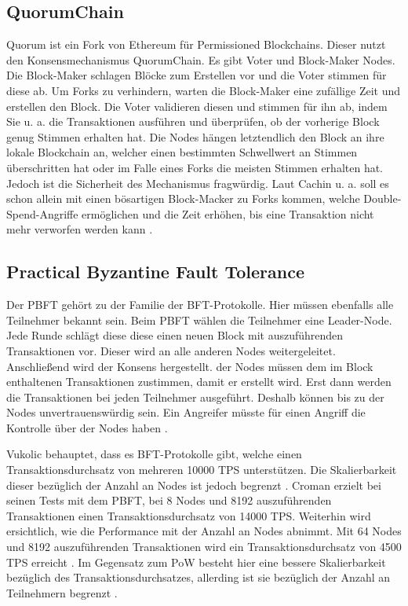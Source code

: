 \subsection{QuorumChain}
Quorum ist ein Fork von Ethereum für Permissioned Blockchains. Dieser nutzt den Konsensmechanismus QuorumChain. Es gibt Voter und Block-Maker Nodes. Die Block-Maker schlagen Blöcke zum Erstellen vor und die Voter stimmen für diese ab. Um Forks zu verhindern, warten die Block-Maker eine zufällige Zeit und erstellen den Block. Die Voter validieren diesen und stimmen für ihn ab, indem Sie u. a. die Transaktionen ausführen und überprüfen, ob der vorherige Block genug Stimmen erhalten hat. Die Nodes hängen letztendlich den Block an ihre lokale Blockchain an, welcher einen bestimmten Schwellwert an Stimmen überschritten hat oder im Falle eines Forks die meisten Stimmen erhalten hat. Jedoch ist die Sicherheit des Mechanismus fragwürdig. Laut Cachin u. a. soll es schon allein mit einen bösartigen Block-Macker zu Forks kommen, welche Double-Spend-Angriffe ermöglichen und die Zeit erhöhen, bis eine Transaktion nicht mehr verworfen werden kann \cite{CachinBlockchainConsensusProtocols2017}.

\subsection{Practical Byzantine Fault Tolerance}
Der \acs{PBFT} gehört zu der Familie der \acs{BFT}-Protokolle. Hier müssen ebenfalls alle Teilnehmer bekannt sein. Beim \acs{PBFT} wählen die Teilnehmer eine Leader-Node. Jede Runde schlägt diese diese einen neuen Block mit auszuführenden Transaktionen vor. Dieser wird an alle anderen Nodes weitergeleitet. Anschließend wird der Konsens hergestellt.  der Nodes müssen dem im Block enthaltenen Transaktionen zustimmen, damit er erstellt wird. Erst dann werden die Transaktionen bei jeden Teilnehmer ausgeführt. Deshalb können bis zu  der Nodes unvertrauenswürdig sein. Ein Angreifer müsste für einen Angriff die Kontrolle über  der Nodes haben \cite{SukhwaniPerformanceModelingPBFT2017a}\cite{ZhengBlockchainChallengesOpportunities2017}. 

Vukolic behauptet, dass es \acs{BFT}-Protokolle gibt, welche einen Transaktionsdurchsatz von mehreren 10000 \acs{TPS} unterstützen. Die Skalierbarkeit dieser bezüglich der Anzahl an Nodes ist jedoch begrenzt \cite{Vukolicquestscalableblockchain2015}. Croman erzielt bei seinen Tests mit dem PBFT, bei 8 Nodes und 8192 auszuführenden Transaktionen einen Transaktionsdurchsatz von 14000 \acs{TPS}. Weiterhin wird ersichtlich, wie die Performance mit der Anzahl an Nodes abnimmt. Mit 64 Nodes und 8192 auszuführenden Transaktionen wird ein Transaktionsdurchsatz von 4500 \acs{TPS} erreicht \cite{CromanScalingDecentralizedBlockchains2016}. Im Gegensatz zum \acs{PoW} besteht hier eine bessere Skalierbarkeit bezüglich des Transaktionsdurchsatzes, allerding ist sie bezüglich der Anzahl an Teilnehmern begrenzt \cite{Vukolicquestscalableblockchain2015}.

